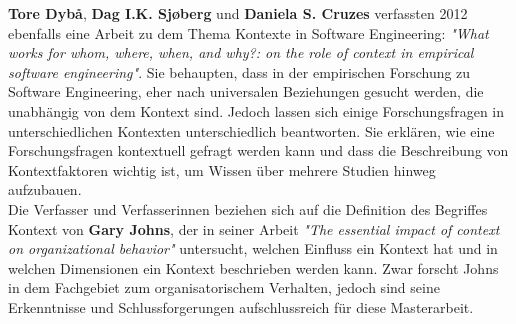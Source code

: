 \textbf{Tore Dyb\r{a}}, \textbf{Dag I.K. Sj\o{}berg} und \textbf{Daniela S. Cruzes} verfassten 2012 ebenfalls eine Arbeit zu dem Thema Kontexte in Software Engineering: \textit{"What works for whom, where, when, and why?: on the role of context in empirical software engineering"}. \cite{contextEmpiSE} Sie behaupten, dass in der empirischen Forschung zu Software Engineering, eher nach universalen Beziehungen gesucht werden, die unabhängig von dem Kontext sind. Jedoch lassen sich einige Forschungsfragen in unterschiedlichen Kontexten unterschiedlich beantworten. Sie erklären, wie eine Forschungsfragen kontextuell gefragt werden kann und dass die Beschreibung von Kontextfaktoren wichtig ist, um Wissen über mehrere Studien hinweg aufzubauen. \\
Die Verfasser und Verfasserinnen beziehen sich auf die Definition des Begriffes Kontext von \textbf{Gary Johns}, der in seiner Arbeit \textit{"The essential impact of context on organizational behavior"} untersucht, welchen Einfluss ein Kontext hat und in welchen Dimensionen ein Kontext beschrieben werden kann. \cite{impactContext}  Zwar forscht Johns in dem Fachgebiet zum organisatorischem Verhalten, jedoch sind seine Erkenntnisse und Schlussforgerungen aufschlussreich für diese Masterarbeit. \\

